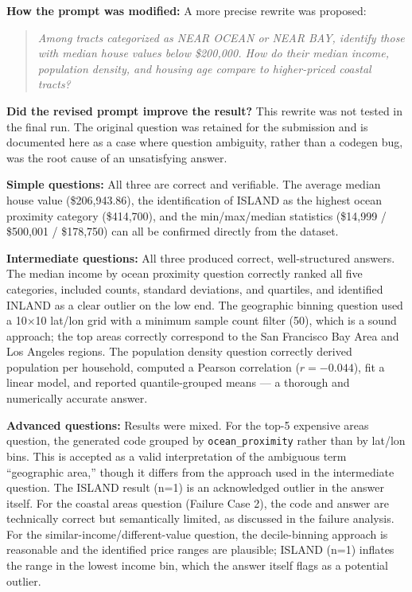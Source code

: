 \documentclass[12pt, oneside]{report}
\begin{document}
\textbf{How the prompt was modified:} A more precise rewrite was proposed:

\begin{quote}
\textit{Among tracts categorized as NEAR OCEAN or NEAR BAY, identify those with median house values below \$200,000. How do their median income, population density, and housing age compare to higher-priced coastal tracts?}
\end{quote}

\textbf{Did the revised prompt improve the result?} This rewrite was not tested in the final run. The original question was retained for the submission and is documented here as a case where question ambiguity, rather than a codegen bug, was the root cause of an unsatisfying answer.



\textbf{Simple questions:} All three are correct and verifiable. The average median house value (\$206,943.86), the identification of ISLAND as the highest ocean proximity category (\$414,700), and the min/max/median statistics (\$14,999 / \$500,001 / \$178,750) can all be confirmed directly from the dataset.

\textbf{Intermediate questions:} All three produced correct, well-structured answers. The median income by ocean proximity question correctly ranked all five categories, included counts, standard deviations, and quartiles, and identified INLAND as a clear outlier on the low end. The geographic binning question used a 10$\times$10 lat/lon grid with a minimum sample count filter (50), which is a sound approach; the top areas correctly correspond to the San Francisco Bay Area and Los Angeles regions. The population density question correctly derived population per household, computed a Pearson correlation ($r = -0.044$), fit a linear model, and reported quantile-grouped means --- a thorough and numerically accurate answer.

\textbf{Advanced questions:} Results were mixed. For the top-5 expensive areas question, the generated code grouped by \texttt{ocean\_proximity} rather than by lat/lon bins. This is accepted as a valid interpretation of the ambiguous term ``geographic area,'' though it differs from the approach used in the intermediate question. The ISLAND result (n=1) is an acknowledged outlier in the answer itself. For the coastal areas question (Failure Case 2), the code and answer are technically correct but semantically limited, as discussed in the failure analysis. For the similar-income/different-value question, the decile-binning approach is reasonable and the identified price ranges are plausible; ISLAND (n=1) inflates the range in the lowest income bin, which the answer itself flags as a potential outlier.
\end{document}
